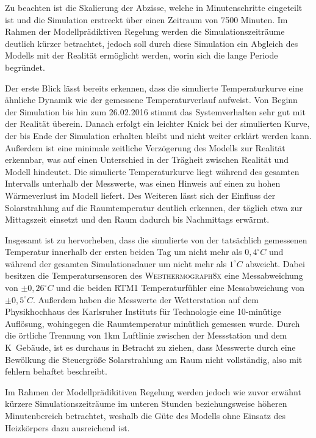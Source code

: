 Zu beachten ist die Skalierung der Abzisse, welche in Minutenschritte eingeteilt ist und die Simulation erstreckt über einen Zeitraum von 7500 Minuten. Im Rahmen der Modellprädiktiven Regelung werden die Simulationszeiträume deutlich kürzer betrachtet, jedoch soll durch diese Simulation ein Abgleich des Modells mit der Realität ermöglicht werden, worin sich die lange Periode begründet.

Der erste Blick lässt bereits erkennen, dass die simulierte Temperaturkurve eine ähnliche Dynamik wie der gemessene Temperaturverlauf aufweist. Von Beginn der Simulation bis hin zum 26.02.2016 stimmt das Systemverhalten sehr gut mit der Realität überein. Danach erfolgt ein leichter Knick bei der simulierten Kurve, der bis Ende der Simulation erhalten bleibt und nicht weiter erklärt werden kann. 
Außerdem ist eine minimale zeitliche Verzögerung des Modells zur Realität erkennbar, was auf einen Unterschied in der Trägheit zwischen Realität und Modell hindeutet.
Die simulierte Temperaturkurve liegt während des gesamten Intervalls unterhalb der Messwerte, was einen Hinweis auf einen zu hohen Wärmeverlust im Modell liefert.  
Des Weiteren lässt sich der Einfluss der Solarstrahlung auf die Raumtemperatur deutlich erkennen, der täglich etwa zur Mittagszeit einsetzt und den Raum dadurch bis Nachmittags erwärmt.

Insgesamt ist zu hervorheben, dass die simulierte von der tatsächlich gemessenen Temperatur innerhalb der ersten beiden Tag um nicht mehr als $0,4^{\circ}C$ und während der gesamten Simulationsdauer um nicht mehr als $1^{\circ}C$ abweicht.
Dabei besitzen die Temperatursensoren des \textsc{Webthermograph8x} eine Messabweichung von $\pm 0,26^{\circ}C$ und die beiden RTM1 Temperaturfühler eine Messabweichung von $\pm 0,5^{\circ}C$.
Außerdem haben die Messwerte der Wetterstation auf dem Physikhochhaus des Karlsruher Instituts für Technologie eine 10-minütige Auflösung, wohingegen die Raumtemperatur minütlich gemessen wurde.
Durch die örtliche Trennung von 1km Luftlinie zwischen der Messstation und dem K~Gebäude, ist es durchaus in Betracht zu ziehen, dass Messwerte durch eine Bewölkung die Steuergröße Solarstrahlung am Raum nicht vollständig, also mit fehlern behaftet beschreibt.

Im Rahmen der Modellprädikitiven Regelung werden jedoch wie zuvor erwähnt kürzere Simulationszeiträume im unteren Stunden beziehungsweise höheren Minutenbereich betrachtet, weshalb die Güte des Modells ohne Einsatz des Heizkörpers dazu ausreichend ist.

